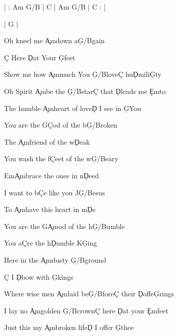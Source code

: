 \documentclass[9pt]{extarticle}
\begin{document}
\bsong

\bi
| : Am G/B  | C |  Am G/B  | C : |

| G |
\ei

\bv
Oh kneel me \c{Am}down a\c{G/B}gain

\c{C} Here \c{D}at Your \c{G}feet

Show me how \c{Am}much You \c{G/B}love\c{C} hu\c{D}mili\c{G}ty

Oh Spirit \c{Am}be the \c{G/B}star\c{C} that \c{D}leads me \c{Em}to

The humble \c{Am}heart of love\c{D} I see in \c{G}You
\ev

\bc
You are the G\c{C}od of the b\c{G/B}roken

The \c{Am}friend of the w\c{D}eak

You wash the f\c{C}eet of the w\c{G/B}eary

Em\c{Am}brace the ones in n\c{D}eed



I want to b\c{C}e like you J\c{G/B}esus

To \c{Am}have this heart in m\c{D}e

You are the G\c{Am}od of the h\c{G/B}umble

You a\c{C}re the h\c{D}umble K\c{G}ing
\ec

\bv
Here in the \c{Am}dusty \c{G/B}ground

\c{C} I \c{D}bow with \c{G}kings

Where wise men \c{Am}laid be\c{G/B}fore\c{C} their \c{D}offe\c{G}rings

I lay no \c{Am}golden \c{G/B}crown\c{C} here \c{D}at your \c{Em}feet

Just this my \c{Am}broken life\c{D} I offer \c{G}thee
\ev


\esong
\end{document}
